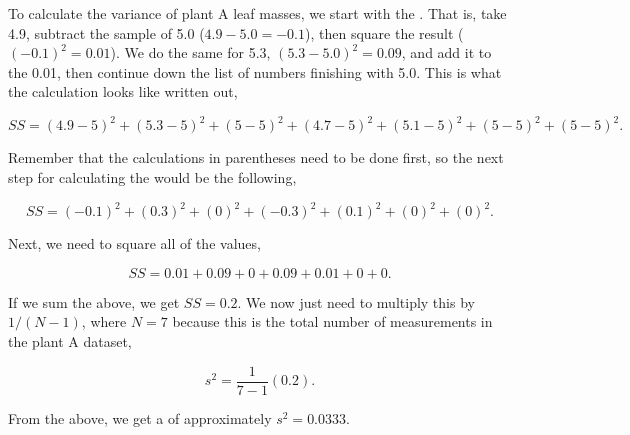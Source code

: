 \documentclass[
  openany]{krantz}
\begin{document}
To calculate the variance of plant A leaf masses, we start with the .
That is, take 4.9, subtract the sample  of 5.0 (\(4.9 - 5.0 = -0.1\)), then square the result (\((-0.1)^{2} = 0.01\)).
We do the same for 5.3, \((5.3 - 5.0)^{2} = 0.09\), and add it to the 0.01, then continue down the list of numbers finishing with 5.0.
This is what the  calculation looks like written out,

\[SS = (4.9 - 5)^{2} + (5.3 - 5)^{2} + (5 - 5)^{2} + (4.7 - 5)^{2} + (5.1 - 5)^{2} + (5 - 5)^{2} + (5 - 5)^{2}.\]

Remember that the calculations in parentheses need to be done first, so the next step for calculating the  would be the following,

\[SS = (-0.1)^{2} + (0.3)^{2} + (0)^{2} + (-0.3)^{2} + (0.1)^{2} + (0)^{2} + (0)^{2}.\]

Next, we need to square all of the values,

\[SS = 0.01 + 0.09 + 0 + 0.09 + 0.01 + 0 + 0.\]

If we sum the above, we get \(SS = 0.2\).
We now just need to multiply this by \(1 / (N - 1)\), where \(N = 7\) because this is the total number of measurements in the plant A dataset,

\[s^{2} = \frac{1}{7 - 1}\left(0.2\right).\]

From the above, we get a  of approximately \(s^{2} = 0.0333\).
\end{document}
